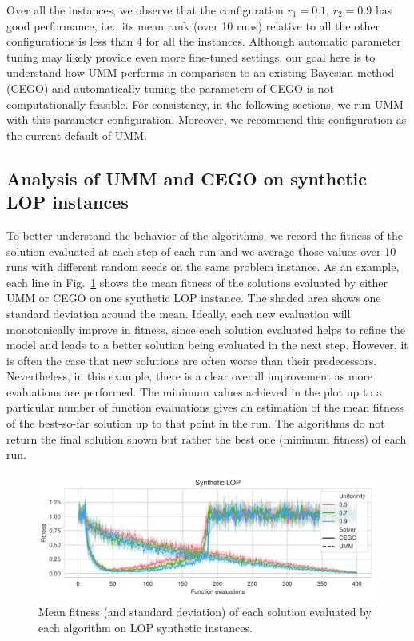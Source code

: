 \documentclass[runningheads]{llncs}
\begin{document}
Over all the instances, we observe that the configuration $r_1 =0.1$, $r_2=0.9$
has good performance, i.e., its mean rank (over 10 runs) relative to all the
other configurations is less than 4 for all the instances.  Although automatic
parameter tuning may likely provide even more fine-tuned settings, our goal
here is to understand how UMM performs in comparison to an existing Bayesian
method (CEGO) and automatically tuning the parameters of CEGO is not
computationally feasible.  For consistency, in the following sections, we run
UMM with this parameter configuration.  Moreover, we recommend this
configuration as the current default of UMM.

\subsection{Analysis of UMM and CEGO on synthetic LOP instances}

To better understand the behavior of the algorithms, we record the fitness of
the solution evaluated at each step of each run and we average those values
over 10 runs with different random seeds on the same problem instance.  As an example, each line in Fig.~\ref{fig:lop_synth} 
shows the mean fitness of the solutions evaluated by either UMM or CEGO on one synthetic LOP
instance. The shaded area shows one standard deviation around the
mean. Ideally, each new evaluation will monotonically improve in fitness, since each solution evaluated helps to refine the model and leads to a
better solution being evaluated in the next step.  However, it is often the case that 
new solutions
are often worse than their predecessors. Nevertheless, in this example, there
is a clear overall improvement as more evaluations are performed. The minimum
values achieved in the plot up to a particular number of function evaluations
gives an estimation of the mean fitness of the best-so-far solution up to that
point in the run. The algorithms do not return the final solution shown but
rather the best one (minimum fitness) of each run.


\begin{figure}[tb]
  \centering%
  \includegraphics[width=\textwidth]{../img/synthetic_LOP_combined}
  \caption{Mean fitness  (and standard deviation)  of each solution evaluated by each algorithm on LOP synthetic instances.\label{fig:lop_synth}}
\end{figure}
\end{document}
